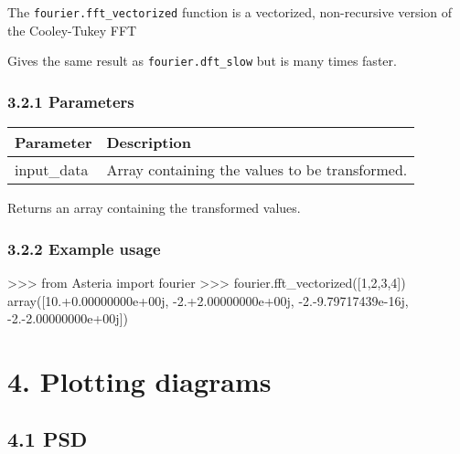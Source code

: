 \documentclass[]{article}
\newenvironment{Shaded}{}{}
\newcommand{\DecValTok}[1]{\textcolor[rgb]{0.25,0.63,0.44}{#1}}
\newcommand{\FloatTok}[1]{\textcolor[rgb]{0.25,0.63,0.44}{#1}}
\newcommand{\ImportTok}[1]{#1}
\newcommand{\OperatorTok}[1]{\textcolor[rgb]{0.40,0.40,0.40}{#1}}
\newcommand{\NormalTok}[1]{#1}
\begin{document}
The \texttt{fourier.fft\_vectorized} function is a vectorized,
non-recursive version of the Cooley-Tukey FFT

Gives the same result as \texttt{fourier.dft\_slow} but is many times
faster.

\subsubsection{3.2.1 Parameters}\label{parameters-1}

\begin{longtable}[]{@{}ll@{}}
\toprule
Parameter & Description\tabularnewline
\midrule
\endhead
input\_data & Array containing the values to be
transformed.\tabularnewline
\bottomrule
\end{longtable}

Returns an array containing the transformed values.

\subsubsection{3.2.2 Example usage}\label{example-usage-1}

\begin{Shaded}
\begin{Highlighting}[]
\OperatorTok{>>>} \ImportTok{from}\NormalTok{ Asteria }\ImportTok{import}\NormalTok{ fourier}
\OperatorTok{>>>}\NormalTok{ fourier.fft_vectorized([}\DecValTok{1}\NormalTok{,}\DecValTok{2}\NormalTok{,}\DecValTok{3}\NormalTok{,}\DecValTok{4}\NormalTok{])}
\NormalTok{array([}\DecValTok{10}\NormalTok{.}\OperatorTok{+}\FloatTok{0.}\NormalTok{00000000e}\OperatorTok{+}\NormalTok{00j, }\OperatorTok{-}\DecValTok{2}\NormalTok{.}\OperatorTok{+}\FloatTok{2.}\NormalTok{00000000e}\OperatorTok{+}\NormalTok{00j, }\OperatorTok{-}\DecValTok{2}\NormalTok{.}\OperatorTok{-}\FloatTok{9.}\NormalTok{79717439e}\OperatorTok{-}\NormalTok{16j, }\OperatorTok{-}\DecValTok{2}\NormalTok{.}\OperatorTok{-}\FloatTok{2.}\NormalTok{00000000e}\OperatorTok{+}\NormalTok{00j])}
\end{Highlighting}
\end{Shaded}

\section{4. Plotting diagrams}\label{plotting-diagrams}

\subsection{4.1 PSD}\label{psd}
\end{document}
